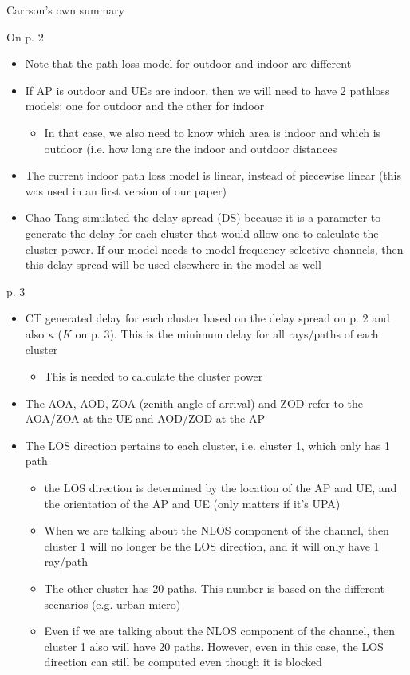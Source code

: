 \documentclass{beamer}
\begin{document}
\begin{frame}[allowframebreaks]{Carrson's own summary}

On p. 2 \\
\begin{itemize}
	\item Note that the path loss model for outdoor and indoor are different
	\item If AP is outdoor and UEs are indoor, then we will need to have 2 pathloss models: one for outdoor and the other for indoor
	\begin{itemize}
		\item In that case, we also need to know which area is indoor and which is outdoor (i.e. how long are the indoor and outdoor distances
	\end{itemize}
	\item The current indoor path loss model is linear, instead of piecewise linear (this was used in an first version of our paper)
	\item Chao Tang simulated the delay spread (DS) because it is a parameter to generate the delay for each cluster that would allow one to calculate the cluster power.  If our model needs to model frequency-selective channels, then this delay spread will be used elsewhere in the model as well
\end{itemize}

p. 3 \\
\begin{itemize}
	\item CT generated delay for each cluster based on the delay spread on p. 2 and also $\kappa$ ($K$  on p. 3).  This is the minimum delay for all rays/paths of each cluster
	\begin{itemize}
		\item This is needed to calculate the cluster power
	\end{itemize}
	\item The AOA, AOD, ZOA (zenith-angle-of-arrival) and ZOD refer to the AOA/ZOA at the UE and AOD/ZOD at the AP
	\item The LOS direction pertains to each cluster, i.e. cluster 1, which only has 1 path
	\begin{itemize}
		\item the LOS direction is determined by the location of the AP and UE, and the orientation of the AP and UE (only matters if it's UPA)
		\item When we are talking about the NLOS component of the channel, then cluster 1 will no longer be the LOS direction, and it will only have 1 ray/path
		\item The other cluster has 20 paths.  This number is based on the different scenarios (e.g. urban micro)
		\item Even if we are talking about the NLOS component of the channel, then cluster 1 also will have 20 paths.  However, even in this case, the LOS direction can still be computed even though it is blocked
	\end{itemize}


\end{itemize}
\end{frame}
\end{document}
